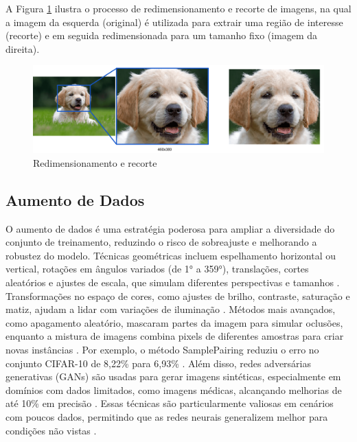 A Figura \ref{fig:redimensionamento_e_recorte} ilustra o processo de redimensionamento e recorte de imagens, na qual a imagem da esquerda (original) é utilizada para extrair uma região de interesse (recorte) e em seguida redimensionada para um tamanho fixo (imagem da direita).

\begin{figure}[H]
    \centering
    \caption{\label{fig:redimensionamento_e_recorte}Redimensionamento e recorte}
    \includegraphics[width=1\textwidth]{img/revisao_bibliografica/redimensionamento_e_recorte.png}
\end{figure}

\subsection{Aumento de Dados}
O aumento de dados é uma estratégia poderosa para ampliar a diversidade do conjunto de treinamento, reduzindo o risco de sobreajuste e melhorando a robustez do modelo. Técnicas geométricas incluem espelhamento horizontal ou vertical, rotações em ângulos variados (de 1° a 359°), translações, cortes aleatórios e ajustes de escala, que simulam diferentes perspectivas e tamanhos \cite{shorten2019survey}. Transformações no espaço de cores, como ajustes de brilho, contraste, saturação e matiz, ajudam a lidar com variações de iluminação \cite{shorten2019survey}. Métodos mais avançados, como apagamento aleatório, mascaram partes da imagem para simular oclusões, enquanto a mistura de imagens combina pixels de diferentes amostras para criar novas instâncias \cite{shorten2019survey}. Por exemplo, o método SamplePairing reduziu o erro no conjunto CIFAR-10 de 8,22\% para 6,93\% \cite{shorten2019survey}. Além disso, redes adversárias generativas (GANs) são usadas para gerar imagens sintéticas, especialmente em domínios com dados limitados, como imagens médicas, alcançando melhorias de até 10\% em precisão \cite{shorten2019survey}. Essas técnicas são particularmente valiosas em cenários com poucos dados, permitindo que as redes neurais generalizem melhor para condições não vistas \cite{nalepa2022data}.

